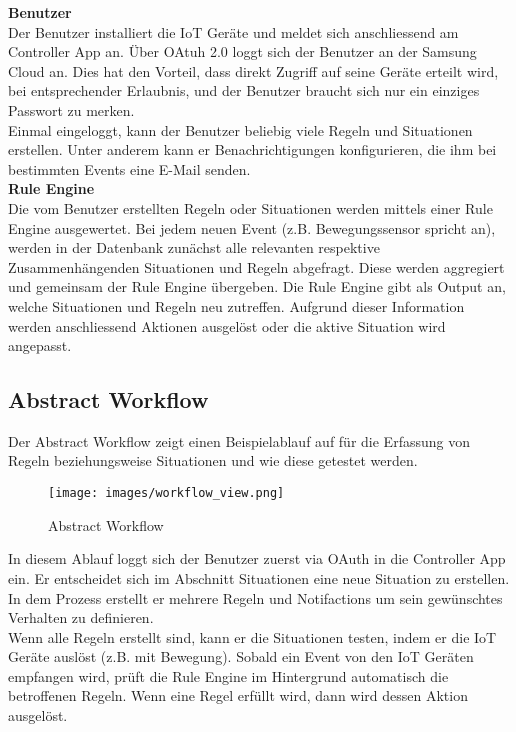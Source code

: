 %
\textbf{Benutzer} \\
Der Benutzer installiert die IoT Geräte und meldet sich anschliessend am Controller App an. Über OAtuh 2.0 loggt sich der Benutzer an der Samsung Cloud an. Dies hat den Vorteil, dass direkt Zugriff auf seine Geräte erteilt wird, bei entsprechender Erlaubnis, und der Benutzer braucht sich nur ein einziges Passwort zu merken.\\%
Einmal eingeloggt, kann der Benutzer beliebig viele Regeln und Situationen erstellen. Unter anderem kann er Benachrichtigungen konfigurieren, die ihm bei bestimmten Events eine E-Mail senden.\\[2ex]
%
\textbf{Rule Engine} \\
Die vom Benutzer erstellten Regeln oder Situationen werden mittels einer Rule Engine ausgewertet. Bei jedem neuen Event (z.B. Bewegungssensor spricht an), werden in der Datenbank zunächst alle relevanten respektive Zusammenhängenden Situationen und Regeln abgefragt. Diese werden aggregiert und gemeinsam der Rule Engine übergeben. Die Rule Engine gibt als Output an, welche Situationen und Regeln neu zutreffen. Aufgrund dieser Information werden anschliessend Aktionen ausgelöst oder die aktive Situation wird angepasst.
%
\clearpage
%
\subsection{Abstract Workflow}
Der Abstract Workflow zeigt einen Beispielablauf auf für die Erfassung von Regeln beziehungsweise Situationen und wie diese getestet werden.

\begin{figure}[ht]
  \begin{center}
    \texttt{[image: images/workflow\_view.png]}
    \caption[Abstract Workflow]{Abstract Workflow}
    \label{fig:workflow_view}
  \end{center}
\end{figure}
%
In diesem Ablauf loggt sich der Benutzer zuerst via OAuth in die Controller App ein. Er entscheidet sich im Abschnitt Situationen eine neue Situation zu erstellen. In dem Prozess erstellt er mehrere Regeln und Notifactions um sein gewünschtes Verhalten zu definieren.\\
%
Wenn alle Regeln erstellt sind, kann er die Situationen testen, indem er die IoT Geräte auslöst (z.B. mit Bewegung). Sobald ein Event von den IoT Geräten empfangen wird, prüft die Rule Engine im Hintergrund automatisch die betroffenen Regeln. Wenn eine Regel erfüllt wird, dann wird dessen Aktion ausgelöst.
%
\clearpage
%
